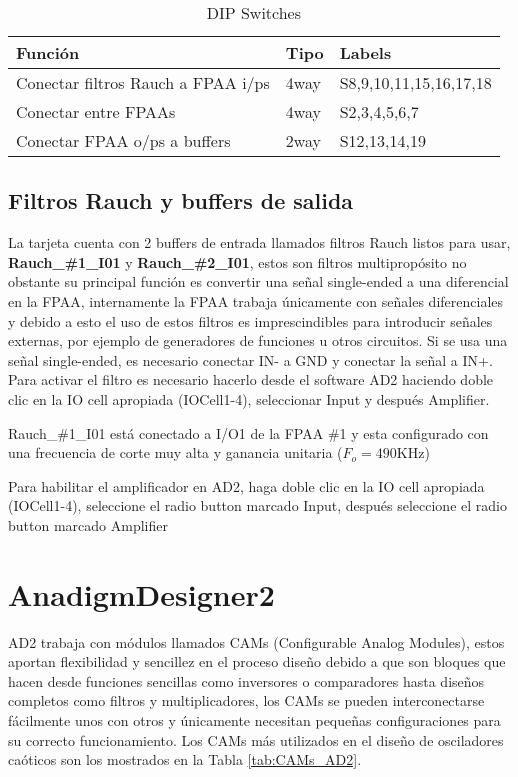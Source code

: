 	\begin{table}[!ht]
		\centering
		\begin{tabular}{|l|l|l|}
			\hline
			\textbf{Función} &  \textbf{Tipo} & \textbf{Labels}\\
			\hline
			Conectar filtros Rauch a FPAA i/ps 					& 4way 		& S8,9,10,11,15,16,17,18		\\
			\hline
			Conectar entre FPAAs 						& 4way 	& S2,3,4,5,6,7	\\
			\hline
			Conectar FPAA o/ps a buffers 						& 2way 		& S12,13,14,19		\\
			\hline
		\end{tabular}
		\caption{DIP Switches}
		\label{tab:switches}
	\end{table}



	
	\subsection{Filtros Rauch y buffers de salida}
	
	La tarjeta cuenta con 2 buffers de entrada llamados filtros Rauch listos para usar, \textbf{Rauch\_\#1\_I01} y \textbf{Rauch\_\#2\_I01}, estos son filtros multipropósito no obstante su principal función es convertir una señal single-ended a una diferencial en la FPAA, internamente la FPAA trabaja únicamente con señales diferenciales y debido a esto el uso de estos filtros es imprescindibles para introducir señales externas, por ejemplo de generadores de funciones u otros circuitos. Si se usa una señal single-ended, es necesario conectar IN- a GND y conectar la señal a IN+.
	Para activar el filtro es necesario hacerlo desde el software AD2 haciendo doble clic en la IO cell apropiada (IOCell1-4), seleccionar Input y después Amplifier.
	
	Rauch\_\#1\_I01 está conectado a I/O1 de la FPAA \#1 y esta configurado con una frecuencia de corte muy alta y ganancia unitaria ($F_{o} = 490$KHz)
	
	Para habilitar el amplificador en AD2, haga doble clic en la IO cell apropiada (IOCell1-4), seleccione el radio button marcado Input, después seleccione el radio button marcado Amplifier
	\section{AnadigmDesigner2}
	
	AD2 trabaja con módulos llamados CAMs (Configurable Analog Modules), estos aportan flexibilidad y sencillez en el proceso diseño debido a que son bloques que hacen desde funciones sencillas como inversores o comparadores hasta diseños completos como filtros y multiplicadores, los CAMs se pueden interconectarse fácilmente unos con otros y únicamente necesitan pequeñas configuraciones para su correcto funcionamiento. Los CAMs más utilizados en el diseño de osciladores caóticos son los mostrados en la Tabla \ref{tab:CAMs_AD2}.
	

